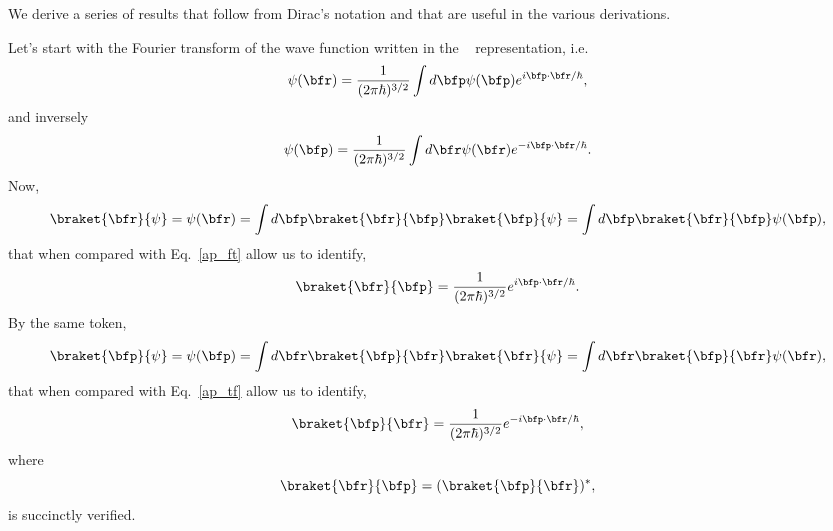 We derive a series of results that follow from Dirac's notation and
that are  useful in the various derivations.

Let's start with the Fourier transform of the wave function written in
the \sch~ representation, i.e.
\begin{equation}\label{ap_ft}
\psi(\bfr) = \frac{1}{(2\pi\hbar)^{3/2}}\int d\bfp \psi(\bfp)e^{i\bfp\cdot\bfr/\hbar}
,
\end{equation}  
and inversely 
\begin{equation}\label{ap_tf}
\psi(\bfp) = \frac{1}{(2\pi\hbar)^{3/2}}\int d\bfr \psi(\bfr)
e^{-i\bfp\cdot\bfr/\hbar}
.
\end{equation}  
Now,
\begin{equation}\label{rpsi}
\braket{\bfr}{\psi}=\psi(\bfr)=\int d\bfp \braket{\bfr}{\bfp}\braket{\bfp}{\psi}=
\int d\bfp \braket{\bfr}{\bfp}\psi(\bfp)
,
\end{equation}
that when compared with Eq.~\eqref{ap_ft} allow us to identify,
\begin{equation}\label{rp2}
\braket{\bfr}{\bfp}=\frac{1}{(2\pi\hbar)^{3/2}}e^{i\bfp\cdot\bfr/\hbar}
.
\end{equation}
By the same token,
\begin{equation}\label{rpsi2}
\braket{\bfp}{\psi}=\psi(\bfp)=\int d\bfr \braket{\bfp}{\bfr}\braket{\bfr}{\psi}=
\int d\bfr \braket{\bfp}{\bfr}\psi(\bfr)
,
\end{equation}
that when compared with Eq.~\eqref{ap_tf} allow us to identify,
\begin{equation}\label{rp}
\braket{\bfp}{\bfr}=\frac{1}{(2\pi\hbar)^{3/2}}e^{-i\bfp\cdot\bfr/\hbar}
,
\end{equation}
where
\begin{equation}\label{ap_good}
\braket{\bfr}{\bfp}=(\braket{\bfp}{\bfr})^*
,
\end{equation}
is succinctly verified.
 
